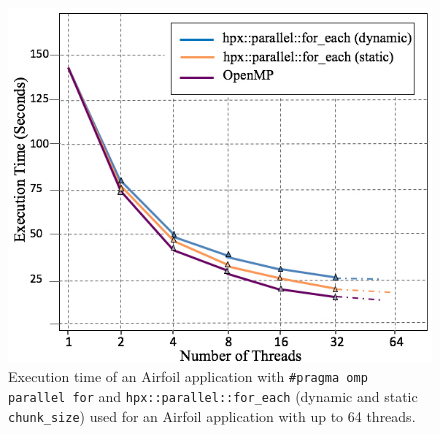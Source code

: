 \documentclass[conference]{IEEEtran}
\begin{document}
\begin{figure} 
\begin{center}
\centering
\includegraphics[width=1\columnwidth]{Pictures/parallel_for_each2.jpg}
\caption {\small{Execution time of an Airfoil application with \texttt{\#pragma omp parallel for} and \texttt{hpx::parallel::for\_each} (dynamic and static \texttt{chunk\_size}) used for an Airfoil application
with up to 64 threads.}}
\label{f1b}
\end{center}
\end{figure}
\end{document}

